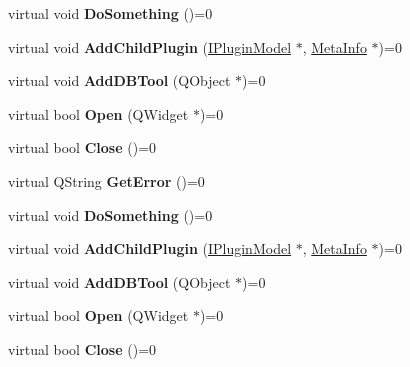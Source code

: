 \begin{DoxyCompactItemize}
virtual void {\bfseries Do\+Something} ()=0
\item 
\mbox{\label{class_i_plugin_model_aff406b0571f6dc77488c315e0df0f563}} 
virtual void {\bfseries Add\+Child\+Plugin} (\hyperlink{class_i_plugin_model}{I\+Plugin\+Model} $\ast$, \hyperlink{struct_meta_info}{Meta\+Info} $\ast$)=0
\item 
\mbox{\label{class_i_plugin_model_a2db1262756c4a587fd6cd2d7191841fb}} 
virtual void {\bfseries Add\+D\+B\+Tool} (Q\+Object $\ast$)=0
\item 
\mbox{\label{class_i_plugin_model_ac1c51202f69db707ca56e8f3c78ce163}} 
virtual bool {\bfseries Open} (Q\+Widget $\ast$)=0
\item 
\mbox{\label{class_i_plugin_model_a3f9ce2298f73283fec68fc908db14e57}} 
virtual bool {\bfseries Close} ()=0
\item 
\mbox{\label{class_i_plugin_model_ad42778c15ce3e8fdb9524a6dfd61792a}} 
virtual Q\+String {\bfseries Get\+Error} ()=0
\item 
\mbox{\label{class_i_plugin_model_a377627e683f892ffda2c6225d975251b}} 
virtual void {\bfseries Do\+Something} ()=0
\item 
\mbox{\label{class_i_plugin_model_aff406b0571f6dc77488c315e0df0f563}} 
virtual void {\bfseries Add\+Child\+Plugin} (\hyperlink{class_i_plugin_model}{I\+Plugin\+Model} $\ast$, \hyperlink{struct_meta_info}{Meta\+Info} $\ast$)=0
\item 
\mbox{\label{class_i_plugin_model_a2db1262756c4a587fd6cd2d7191841fb}} 
virtual void {\bfseries Add\+D\+B\+Tool} (Q\+Object $\ast$)=0
\item 
\mbox{\label{class_i_plugin_model_ac1c51202f69db707ca56e8f3c78ce163}} 
virtual bool {\bfseries Open} (Q\+Widget $\ast$)=0
\item 
\mbox{\label{class_i_plugin_model_a3f9ce2298f73283fec68fc908db14e57}} 
virtual bool {\bfseries Close} ()=0

\end{DoxyCompactItemize}
